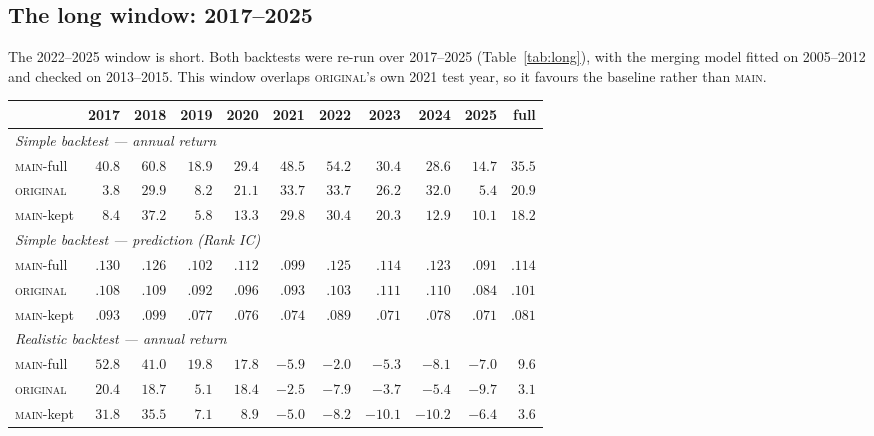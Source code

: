 \documentclass[11pt]{article}
\newcommand{\main}{\textsc{main}}
\newcommand{\orig}{\textsc{original}}
\begin{document}
\subsection{The long window: 2017--2025}
\label{sub:long}

The 2022--2025 window is short. Both backtests were re-run over 2017--2025
(Table~\ref{tab:long}), with the merging model fitted on 2005--2012 and checked on
2013--2015. This window overlaps \orig{}'s own 2021 test year, so it favours the
baseline rather than \main{}.

\begin{table}[h]
\centering\small
\setlength{\tabcolsep}{3.5pt}
\begin{tabular}{lrrrrrrrrrr}
\toprule
& 2017 & 2018 & 2019 & 2020 & 2021 & 2022 & 2023 & 2024 & 2025 & full \\
\midrule
\multicolumn{11}{l}{\emph{Simple backtest --- annual return}} \\
\main{}-full & $\bm{40.8}$ & $\bm{60.8}$ & $\bm{18.9}$ & $\bm{29.4}$ & $\bm{48.5}$ & $\bm{54.2}$ & $\bm{30.4}$ & $28.6$ & $\bm{14.7}$ & $\bm{35.5}$ \\
\orig{}      & $3.8$ & $29.9$ & $8.2$ & $21.1$ & $33.7$ & $33.7$ & $26.2$ & $\bm{32.0}$ & $5.4$ & $20.9$ \\
\main{}-kept  & $8.4$ & $37.2$ & $5.8$ & $13.3$ & $29.8$ & $30.4$ & $20.3$ & $12.9$ & $10.1$ & $18.2$ \\
\midrule
\multicolumn{11}{l}{\emph{Simple backtest --- prediction (Rank IC)}} \\
\main{}-full & $\bm{.130}$ & $\bm{.126}$ & $\bm{.102}$ & $\bm{.112}$ & $\bm{.099}$ & $\bm{.125}$ & $\bm{.114}$ & $\bm{.123}$ & $\bm{.091}$ & $\bm{.114}$ \\
\orig{}      & $.108$ & $.109$ & $.092$ & $.096$ & $.093$ & $.103$ & $.111$ & $.110$ & $.084$ & $.101$ \\
\main{}-kept  & $.093$ & $.099$ & $.077$ & $.076$ & $.074$ & $.089$ & $.071$ & $.078$ & $.071$ & $.081$ \\
\midrule
\multicolumn{11}{l}{\emph{Realistic backtest --- annual return}} \\
\main{}-full & $\bm{52.8}$ & $\bm{41.0}$ & $\bm{19.8}$ & $17.8$ & $-5.9$ & $\bm{-2.0}$ & $-5.3$ & $-8.1$ & $-7.0$ & $\bm{9.6}$ \\
\orig{}      & $20.4$ & $18.7$ & $5.1$ & $\bm{18.4}$ & $\bm{-2.5}$ & $-7.9$ & $\bm{-3.7}$ & $\bm{-5.4}$ & $-9.7$ & $3.1$ \\
\main{}-kept  & $31.8$ & $35.5$ & $7.1$ & $8.9$ & $-5.0$ & $-8.2$ & $-10.1$ & $-10.2$ & $\bm{-6.4}$ & $3.6$ \\

\end{tabular}
\end{table}
\end{document}
